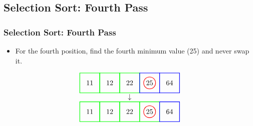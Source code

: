 \documentclass{beamer}
\begin{document}
\subsection{Selection Sort: Fourth Pass}
\begin{frame}[c, fragile]
\frametitle{Selection Sort: Fourth Pass}

\begin{itemize}
    \item For the fourth position, find the fourth minimum value (25) and never swap it.
\end{itemize}

\[
\begin{array}{c}
\begin{tikzpicture}[baseline=(current bounding box.center)]
    \node at (0,0) {11};
    \node at (1,0) {12};
    \node at (2,0) {22};
    \node at (3,0) {25};
    \node at (4,0) {64};
    \draw[red, thick] (3,0) circle (0.3);
    \draw[green, thick] (-0.5,-0.5) rectangle (0.5,0.5);
    \draw[green, thick] (0.5,-0.5) rectangle (1.5,0.5);
    \draw[green, thick] (1.5,-0.5) rectangle (2.5,0.5);
    \draw[blue, thick] (2.5,-0.5) rectangle (3.5,0.5);
    \draw[blue, thick] (3.5,-0.5) rectangle (4.5,0.5);
\end{tikzpicture}  \\
\downarrow \\
\begin{tikzpicture}[baseline=(current bounding box.center)]
    \node at (0,0) {11};
    \node at (1,0) {12};
    \node at (2,0) {22};
    \node at (3,0) {25};
    \node at (4,0) {64};
    \draw[red, thick] (3,0) circle (0.3);
    \draw[green, thick] (-0.5,-0.5) rectangle (0.5,0.5);
    \draw[green, thick] (0.5,-0.5) rectangle (1.5,0.5);
    \draw[green, thick] (1.5,-0.5) rectangle (2.5,0.5);
    \draw[green, thick] (2.5,-0.5) rectangle (3.5,0.5);
    \draw[blue, thick] (3.5,-0.5) rectangle (4.5,0.5);
\end{tikzpicture}
\end{array}
\]

\end{frame}
\end{document}
